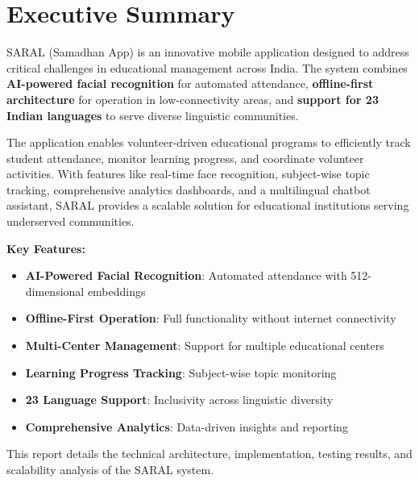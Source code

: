 \documentclass[12pt,a4paper]{article}
\newcommand{\techterm}[1]{\textbf{\textcolor{primary}{#1}}}
\newcommand{\important}[1]{\textbf{\textcolor{accent}{#1}}}
\begin{document}
\section*{Executive Summary}

SARAL (Samadhan App) is an innovative mobile application designed to address critical challenges in educational management across India. The system combines \techterm{AI-powered facial recognition} for automated attendance, \techterm{offline-first architecture} for operation in low-connectivity areas, and \techterm{support for 23 Indian languages} to serve diverse linguistic communities.

The application enables volunteer-driven educational programs to efficiently track student attendance, monitor learning progress, and coordinate volunteer activities. With features like real-time face recognition, subject-wise topic tracking, comprehensive analytics dashboards, and a multilingual chatbot assistant, SARAL provides a scalable solution for educational institutions serving underserved communities.

\vspace{0.5cm}

\noindent\textbf{Key Features:}
\begin{itemize}[leftmargin=*, itemsep=0.3em]
    \item \important{AI-Powered Facial Recognition}: Automated attendance with 512-dimensional embeddings
    \item \important{Offline-First Operation}: Full functionality without internet connectivity
    \item \important{Multi-Center Management}: Support for multiple educational centers
    \item \important{Learning Progress Tracking}: Subject-wise topic monitoring
    \item \important{23 Language Support}: Inclusivity across linguistic diversity
    \item \important{Comprehensive Analytics}: Data-driven insights and reporting
\end{itemize}

\vspace{0.5cm}

This report details the technical architecture, implementation, testing results, and scalability analysis of the SARAL system.

\newpage

\end{document}
